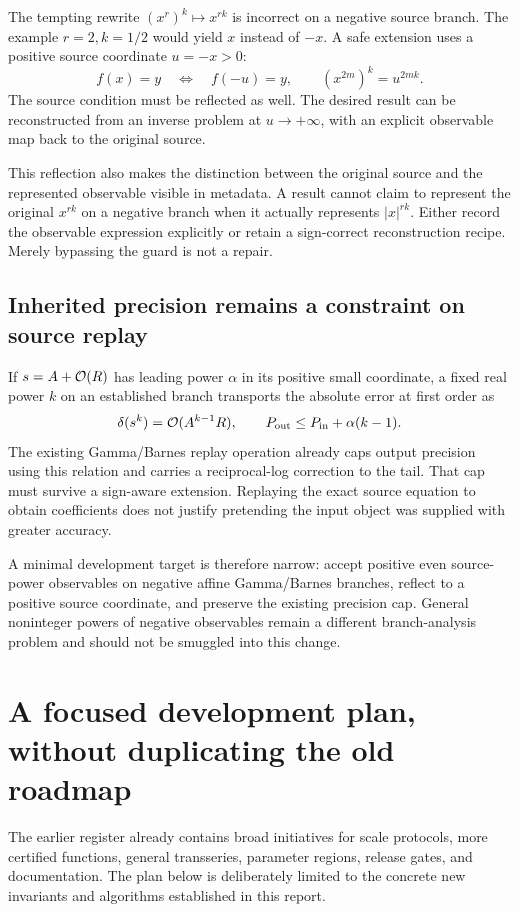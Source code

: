 The tempting rewrite $(x^r)^k\mapsto x^{rk}$ is incorrect on a negative source branch. The example $r=2,k=1/2$ would yield $x$ instead of $-x$. A safe extension uses a positive source coordinate $u=-x>0$:
\[
 f(x)=y\quad\Longleftrightarrow\quad f(-u)=y,
 \qquad (x^{2m})^k=u^{2mk}.
\]
The source condition must be reflected as well. The desired result can be reconstructed from an inverse problem at $u\to+\infty$, with an explicit observable map back to the original source.

This reflection also makes the distinction between the original source and the represented observable visible in metadata. A result cannot claim to represent the original $x^{rk}$ on a negative branch when it actually represents $|x|^{rk}$. Either record the observable expression explicitly or retain a sign-correct reconstruction recipe. Merely bypassing the guard is not a repair.

\subsection{Inherited precision remains a constraint on source replay}

If $s=A+\mathcal{O}(R)$ has leading power $\alpha$ in its positive small coordinate, a fixed real power $k$ on an established branch transports the absolute error at first order as
\[
 \delta(s^k)=\mathcal{O}(A^{k-1}R),
 \qquad P_{\rm out}\le P_{\rm in}+\alpha(k-1).
\]
The existing Gamma/Barnes replay operation already caps output precision using this relation and carries a reciprocal-log correction to the tail. That cap must survive a sign-aware extension. Replaying the exact source equation to obtain coefficients does not justify pretending the input object was supplied with greater accuracy.\cite{gammaops}

A minimal development target is therefore narrow: accept positive even source-power observables on negative affine Gamma/Barnes branches, reflect to a positive source coordinate, and preserve the existing precision cap. General noninteger powers of negative observables remain a different branch-analysis problem and should not be smuggled into this change.

\section{A focused development plan, without duplicating the old roadmap}

The earlier register already contains broad initiatives for scale protocols, more certified functions, general transseries, parameter regions, release gates, and documentation. The plan below is deliberately limited to the concrete new invariants and algorithms established in this report.\cite{status}

